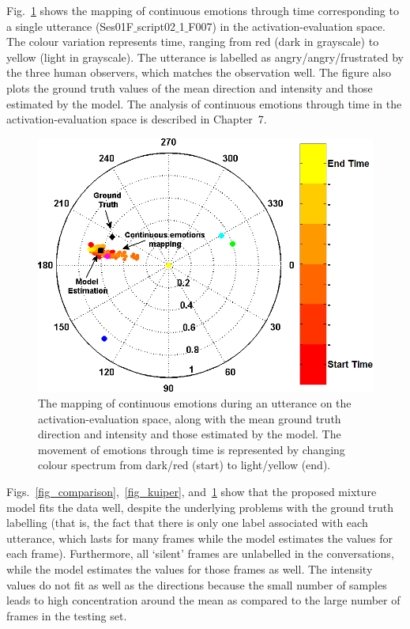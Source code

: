 \documentclass[10pt,journal,cspaper,compsoc]{IEEEtran}
\begin{document}
Fig.~\ref{fig_conv_emotion_space_model} shows the mapping of continuous emotions through time corresponding to a single utterance (Ses01F$\_$script02$\_$1$\_$F007) in the activation-evaluation space. The colour variation represents time, ranging from red (dark in grayscale) to yellow (light in grayscale). The utterance is labelled as angry/angry/frustrated by the three human observers, which matches the observation well. The figure also plots the ground truth values of the mean direction and intensity and those estimated by the model. The analysis of continuous emotions through time in the activation-evaluation space is described in Chapter~7.

\begin{figure}[t!]
      \centering
      \includegraphics[scale=0.4]{figures/Ch6/cont_emotion_transitions.png}
      \caption{The mapping of continuous emotions during an utterance on the activation-evaluation space, along with the mean ground truth direction and intensity and those estimated by the model. The movement of emotions through time is represented by changing colour spectrum from dark/red (start) to light/yellow (end).}
      \label{fig_conv_emotion_space_model}
\end{figure}

Figs.~\ref{fig_comparison},~\ref{fig_kuiper}, and~\ref{fig_conv_emotion_space_model} show that the proposed mixture model fits the data well, despite the underlying problems with the ground truth labelling (that is, the fact that there is only one label associated with each utterance, which lasts for many frames while the model estimates the values for each frame). Furthermore, all `silent' frames are unlabelled in the conversations, while the model estimates the values for those frames as well.  The intensity values do not fit as well as the directions because the small number of samples leads to high concentration around the mean as compared to the large number of frames in the testing set.
\end{document}
